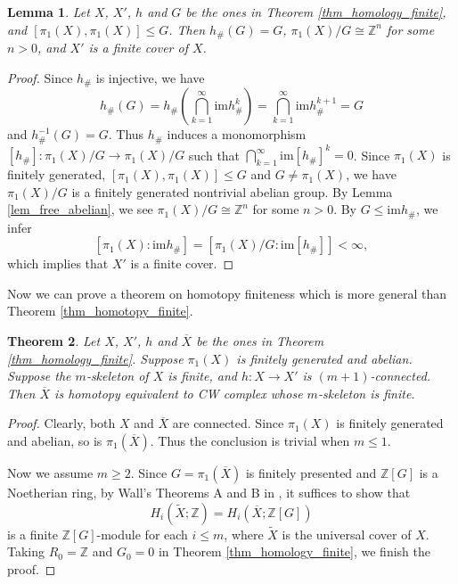 \documentclass[12pt]{amsart}
\theoremstyle{plain}
\newtheorem{theorem}{Theorem}[section]
\newtheorem{lemma}[theorem]{Lemma}
\theoremstyle{definition}
\theoremstyle{question}
\theoremstyle{remark}
\theoremstyle{assumption}
\numberwithin{equation}{section}
\theoremstyle{bigthm}
\begin{document}
\begin{lemma}\label{lem_fundamental_group}
Let $X$, $X'$, $h$ and $G$ be the ones in Theorem \ref{thm_homology_finite}, and $[\pi_{1} (X), \pi_{1} (X)] \le G$. Then $h_{\#} (G) = G$, $\pi_{1} (X)/G \cong \mathbb{Z}^{n}$ for some $n>0$, and $X'$ is a finite cover of $X$.
\end{lemma}
\begin{proof}
Since $h_{\#}$ is injective, we have
\[
h_{\#} (G)= h_{\#} \left( \bigcap_{k=1}^{\infty} \mathrm{im} h_{\#}^{k} \right) = \bigcap_{k=1}^{\infty} \mathrm{im} h_{\#}^{k+1} =G
\]
and $h_{\#}^{-1} (G) = G$. Thus $h_{\#}$ induces a monomorphism $[h_{\#}] \colon  \pi_{1} (X)/G \rightarrow \pi_{1} (X)/G$ such that $\bigcap_{k=1}^{\infty} \mathrm{im} [h_{\#}]^{k} =0$. Since $\pi_{1} (X)$ is finitely generated, $[\pi_{1} (X), \pi_{1} (X)] \le G$ and $G \ne \pi_{1} (X)$, we have $\pi_{1} (X)/G$ is a finitely generated nontrivial abelian group. By Lemma \ref{lem_free_abelian}, we see $\pi_{1} (X)/G \cong \mathbb{Z}^{n}$ for some $n>0$. By $G \le \mathrm{im} h_{\#}$, we infer
\[
[\pi_{1} (X): \mathrm{im} h_{\#}] = [\pi_{1} (X)/G : \mathrm{im} [h_{\#}]] < \infty,
\]
which implies that $X'$ is a finite cover.
\end{proof}

Now we can prove a theorem on homotopy finiteness which is more general than Theorem \ref{thm_homotopy_finite}.
\begin{theorem}\label{thm_homotopy_skeleton}
Let $X$, $X'$, $h$ and $\overline{X}$ be the ones in Theorem \ref{thm_homology_finite}. Suppose $\pi_{1} (X)$ is finitely generated and abelian. Suppose the $m$-skeleton of $X$ is finite, and $h \colon  X \rightarrow X'$ is $(m+1)$-connected. Then $\overline{X}$ is homotopy equivalent to CW complex whose $m$-skeleton is finite.
\end{theorem}
\begin{proof}
Clearly, both $X$ and $\overline{X}$ are connected. Since $\pi_{1} (X)$ is finitely generated and abelian, so is $\pi_{1} (\overline{X})$. Thus the conclusion is trivial when $m \le 1$.

Now we assume $m \ge 2$. Since $G= \pi_{1} (\overline{X})$ is finitely presented and $\mathbb{Z}[G]$ is a Noetherian ring, by Wall's Theorems A and B in \cite{Wall65}, it suffices to show that
\[
H_{i} (\widetilde{X}; \mathbb{Z}) = H_{i} (\overline{X}; \mathbb{Z}[G])
\]
is a finite $\mathbb{Z}[G]$-module for each $i \le m$, where $\widetilde{X}$ is the universal cover of $X$. Taking $R_{0} = \mathbb{Z}$ and $G_{0} =0$ in Theorem \ref{thm_homology_finite}, we finish the proof.
\end{proof}
\end{document}
